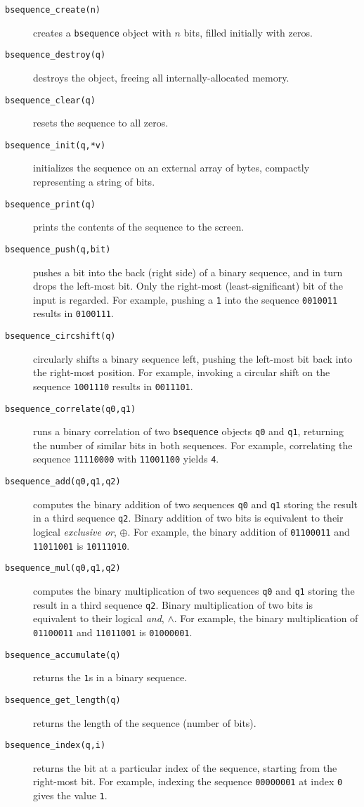 \begin{description}
\item[{\tt bsequence\_create(n)}]
    creates a {\tt bsequence} object with $n$ bits,
    filled initially with zeros.
\item[{\tt bsequence\_destroy(q)}]
    destroys the object, freeing all internally-allocated memory.
\item[{\tt bsequence\_clear(q)}]
    resets the sequence to all zeros.
\item[{\tt bsequence\_init(q,*v)}]
    initializes the sequence on an external array of bytes,
    compactly representing a string of bits.
\item[{\tt bsequence\_print(q)}]
    prints the contents of the sequence to the screen.
\item[{\tt bsequence\_push(q,bit)}]
    pushes a bit into the back (right side) of a binary sequence, and in
    turn drops the left-most bit.
    Only the right-most (least-significant) bit of the input is regarded.
    For example, pushing a {\tt 1} into the sequence {\tt 0010011}
    results in {\tt 0100111}.
\item[{\tt bsequence\_circshift(q)}]
    circularly shifts a binary sequence left, pushing the left-most bit
    back into the right-most position.
    For example, invoking a circular shift on the sequence {\tt 1001110}
    results in {\tt 0011101}.
\item[{\tt bsequence\_correlate(q0,q1)}]
    runs a binary correlation of two {\tt bsequence} objects
    {\tt q0} and {\tt q1},
    returning the number of similar bits in both sequences.
    For example, correlating the sequence
    {\tt 11110000} with
    {\tt 11001100}
    yields {\tt 4}.
\item[{\tt bsequence\_add(q0,q1,q2)}]
    computes the binary addition of two sequences {\tt q0} and {\tt q1}
    storing the result in a third sequence {\tt q2}.
    Binary addition of two bits is equivalent to their logical
    {\em exclusive or}, $\oplus$.
    For example, the binary addition of
    {\tt 01100011} and
    {\tt 11011001} is
    {\tt 10111010}.
\item[{\tt bsequence\_mul(q0,q1,q2)}]
    computes the binary multiplication of two sequences
    {\tt q0} and {\tt q1}
    storing the result in a third sequence {\tt q2}.
    Binary multiplication of two bits is equivalent to their logical
    {\em and}, $\land$.
    For example, the binary multiplication of
    {\tt 01100011} and
    {\tt 11011001} is
    {\tt 01000001}.
\item[{\tt bsequence\_accumulate(q)}]
    returns the {\tt 1}s in a binary sequence.
\item[{\tt bsequence\_get\_length(q)}]
    returns the length of the sequence (number of bits).
\item[{\tt bsequence\_index(q,i)}]
    returns the bit at a particular index of the sequence,
    starting from the right-most bit.
    For example, indexing the sequence {\tt 00000001}
    at index {\tt 0}
    gives the value {\tt 1}.
\end{description}


